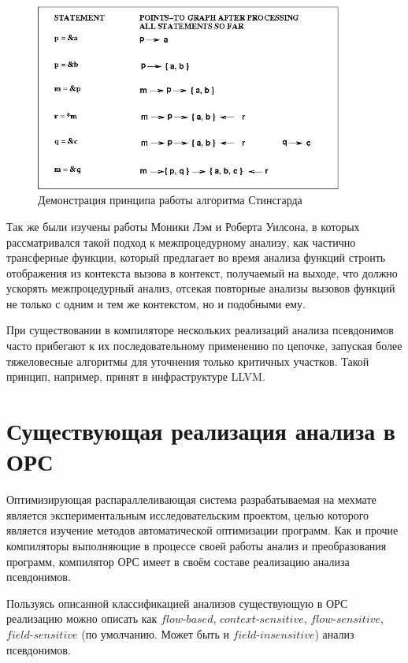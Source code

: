 \begin{figure}[H]
\centering
\includegraphics[width=0.9\textwidth]{img/steensgaard.jpg}
\caption{\label{fig:steensgaard} Демонстрация принципа работы алгоритма Стинсгарда}
\end{figure}

Так же были изучены работы Моники Лэм и Роберта Уилсона, в которых рассматривался такой подход к межпроцедурному анализу, как частично трансферные функции, который предлагает во время анализа функций строить отображения из контекста вызова в контекст, получаемый на выходе, что должно ускорять межпроцедурный анализ, отсекая повторные анализы вызовов функций не только с одним и тем же контекстом, но и подобными ему.

При существовании в компиляторе нескольких реализаций анализа псевдонимов часто прибегают к их последовательному применению по цепочке, запуская более тяжеловесные алгоритмы для уточнения только критичных участков. Такой принцип, например, принят в инфраструктуре LLVM.

\section{Существующая реализация анализа в ОРС}

Оптимизирующая распараллеливающая система разрабатываемая на мехмате является экспериментальным исследовательским проектом, целью которого является изучение методов автоматической оптимизации программ. Как и прочие компиляторы выполняющие в процессе своей работы анализ и преобразования программ, компилятор ОРС имеет в своём составе реализацию анализа псевдонимов.

Пользуясь описанной классификацией анализов существующую в ОРС реализацию можно описать как $flow$-$based$, $context$-$sensitive$, $flow$-$sensitive$, $field$-$sensitive$ (по умолчанию. Может быть и $field$-$insensitive$) анализ псевдонимов.

